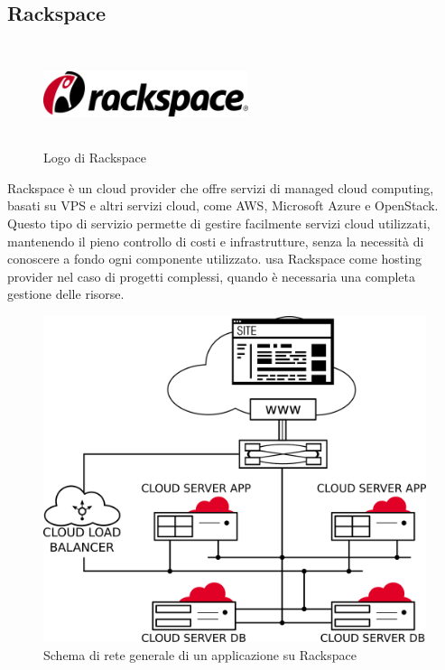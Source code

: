    \subsection{Rackspace}
   \begin{figure}[H]
      \begin{center}
         \includegraphics[width=6cm,height=3cm,keepaspectratio]{immagini/rackspace-logo}
      \end{center}
      \caption{Logo di Rackspace}\label{logorackspace}
   \end{figure}
   Rackspace è un cloud provider che offre servizi di managed cloud computing, basati su \gls{VPS} e altri servizi cloud, come \gls{AWS}, Microsoft Azure e OpenStack. Questo tipo di servizio permette di gestire facilmente servizi cloud utilizzati, mantenendo il pieno controllo di costi e infrastrutture, senza la necessità di conoscere a fondo ogni componente utilizzato. 
   \nomeAzienda{} usa Rackspace come hosting provider nel caso di progetti complessi, quando è necessaria una completa gestione delle risorse.
   \begin{figure}[H]
      \begin{center}
      \includegraphics[width=14cm,keepaspectratio]{immagini/rackspace-network}
      \end{center}
      \caption{Schema di rete generale di un applicazione su Rackspace}
   \end{figure}


